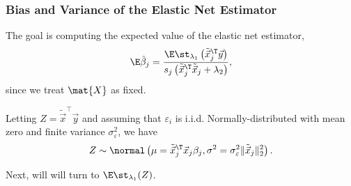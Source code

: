 \documentclass[aspectratio=1610,onlytextwidth]{beamer}
\begin{document}
\begin{frame}[c]
  \frametitle{Bias and Variance of the Elastic Net Estimator}

  The goal is computing the expected value of the elastic net estimator,
  \[
    \E \hat\beta_j = \frac{\E \st_{\lambda_1}\left(\tilde{\vec{x}}_j^\T \vec{y}\right)}{s_j\left(\tilde{\vec{x}}_j^\T \tilde{\vec{x}}_j + \lambda_2\right)},
  \]
  since we treat \(\mat{X}\) as fixed.

  \bigskip\pause

  Letting \(Z = \tilde{\vec{x}}^\intercal \vec{y}\) and assuming that \(\varepsilon_i\) is
  i.i.d. Normally-distributed with mean zero and finite variance \(\sigma_\varepsilon^2\), we
  have
  \[
    Z \sim \normal\left(\mu = \tilde{\vec{x}}_j^\T\vec{x}_j \beta_j, \sigma^2 =  \sigma_\varepsilon^2 \lVert \tilde{\vec{x}}_j\rVert_2^2 \right).
  \]


  \bigskip

  Next, will will turn to \(\E \st_{\lambda_1}(Z)\).
\end{frame}
\end{document}
